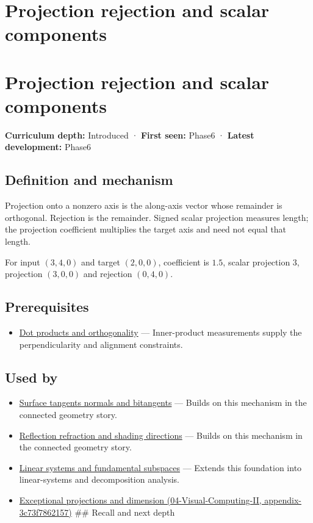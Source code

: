 \hypertarget{appendix-505a502c372a}{}
\section*{Projection rejection and scalar components}
\section{Projection rejection and scalar components}\label{projection-rejection-and-scalar-components}

\textbf{Curriculum depth:} Introduced · \textbf{First seen:} Phase6 · \textbf{Latest development:} Phase6

\subsection{Definition and mechanism}\label{definition-and-mechanism}

Projection onto a nonzero axis is the along-axis vector whose remainder is orthogonal. Rejection is the remainder. Signed scalar projection measures length; the projection coefficient multiplies the target axis and need not equal that length.

For input \((3,4,0)\) and target \((2,0,0)\), coefficient is \(1.5\), scalar projection \(3\), projection \((3,0,0)\) and rejection \((0,4,0)\).

\subsection{Prerequisites}\label{prerequisites}

\begin{itemize}
\tightlist
\item
  \hyperref[appendix-8bc4e8fc547c]{Dot products and orthogonality} --- Inner-product measurements supply the perpendicularity and alignment constraints.
\end{itemize}

\subsection{Used by}\label{used-by}

\begin{itemize}
\item
  \hyperref[appendix-e31893dec985]{Surface tangents normals and bitangents} --- Builds on this mechanism in the connected geometry story.
\item
  \hyperref[appendix-44e00863b4d5]{Reflection refraction and shading directions} --- Builds on this mechanism in the connected geometry story.
\item
  \hyperref[appendix-8572a4a060c1]{Linear systems and fundamental subspaces} --- Extends this foundation into linear-systems and decomposition analysis.
\item
  \href{}{Exceptional projections and dimension (04-Visual-Computing-II, appendix-3c73f7862157)} \#\# Recall and next depth
\end{itemize}

